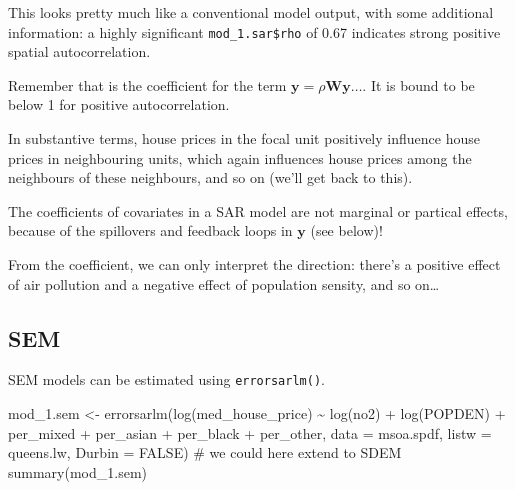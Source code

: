 \documentclass[
  letterpaper,
]{scrbook}
\newenvironment{Shaded}{\begin{snugshade}}{\end{snugshade}}
\newcommand{\AttributeTok}[1]{\textcolor[rgb]{0.40,0.45,0.13}{#1}}
\newcommand{\CommentTok}[1]{\textcolor[rgb]{0.37,0.37,0.37}{#1}}
\newcommand{\ConstantTok}[1]{\textcolor[rgb]{0.56,0.35,0.01}{#1}}
\newcommand{\FunctionTok}[1]{\textcolor[rgb]{0.28,0.35,0.67}{#1}}
\newcommand{\NormalTok}[1]{\textcolor[rgb]{0.00,0.23,0.31}{#1}}
\newcommand{\OtherTok}[1]{\textcolor[rgb]{0.00,0.23,0.31}{#1}}
\newcommand{\SpecialCharTok}[1]{\textcolor[rgb]{0.37,0.37,0.37}{#1}}
\begin{document}
This looks pretty much like a conventional model output, with some
additional information: a highly significant \texttt{mod\_1.sar\$rho} of
0.67 indicates strong positive spatial autocorrelation.

Remember that is the coefficient for the term
\(\boldsymbol{\mathbf{y}} = \rho \boldsymbol{\mathbf{W}} \boldsymbol{\mathbf{y}} \ldots\).
It is bound to be below 1 for positive autocorrelation.

In substantive terms, house prices in the focal unit positively
influence house prices in neighbouring units, which again influences
house prices among the neighbours of these neighbours, and so on (we'll
get back to this).

\begin{tcolorbox}[enhanced jigsaw, colframe=quarto-callout-warning-color-frame, coltitle=black, titlerule=0mm, opacitybacktitle=0.6, toprule=.15mm, colbacktitle=quarto-callout-warning-color!10!white, toptitle=1mm, leftrule=.75mm, colback=white, bottomtitle=1mm, opacityback=0, left=2mm, title=\textcolor{quarto-callout-warning-color}{\faExclamationTriangle}\hspace{0.5em}{Warning}, breakable, arc=.35mm, rightrule=.15mm, bottomrule=.15mm]

The coefficients of covariates in a SAR model are not marginal or
partical effects, because of the spillovers and feedback loops in
\(\boldsymbol{\mathbf{y}}\) (see below)!

From the coefficient, we can only interpret the direction: there's a
positive effect of air pollution and a negative effect of population
sensity, and so on\ldots{}

\end{tcolorbox}

\hypertarget{sem}{%
\subsection{SEM}\label{sem}}

SEM models can be estimated using \texttt{errorsarlm()}.

\begin{Shaded}
\begin{Highlighting}[]
\NormalTok{mod\_1.sem }\OtherTok{\textless{}{-}} \FunctionTok{errorsarlm}\NormalTok{(}\FunctionTok{log}\NormalTok{(med\_house\_price) }\SpecialCharTok{\textasciitilde{}} \FunctionTok{log}\NormalTok{(no2) }\SpecialCharTok{+} \FunctionTok{log}\NormalTok{(POPDEN) }\SpecialCharTok{+}
\NormalTok{                          per\_mixed }\SpecialCharTok{+}\NormalTok{ per\_asian }\SpecialCharTok{+}\NormalTok{ per\_black }\SpecialCharTok{+}\NormalTok{ per\_other,  }
                        \AttributeTok{data =}\NormalTok{ msoa.spdf, }
                        \AttributeTok{listw =}\NormalTok{ queens.lw,}
                        \AttributeTok{Durbin =} \ConstantTok{FALSE}\NormalTok{) }\CommentTok{\# we could here extend to SDEM}
\FunctionTok{summary}\NormalTok{(mod\_1.sem)}
\end{Highlighting}
\end{Shaded}
\end{document}
